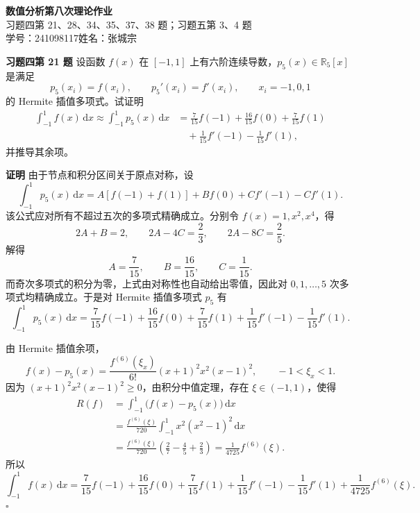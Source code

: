 \documentclass[UTF8,a4paper,11pt]{ctexart}
\newcommand{\dd}{\,\mathrm{d}}
\newcommand{\QED}{\hfill$\square$}
\begin{document}
\begin{center}
  {\LARGE\bfseries 数值分析\quad 第八次理论作业}\\[6pt]
  {\large 习题四第 21、28、34、35、37、38 题；习题五第 3、4 题}\\[4pt]
  {\normalsize 学号：241098117\quad 姓名：张城宗}
\end{center}

\bigskip

\noindent\textbf{习题四\quad 第 21 题}\quad
设函数 $f(x)$ 在 $[-1,1]$ 上有六阶连续导数，$p_5(x)\in \mathbb R_5[x]$ 是满足
\[
  p_5(x_i)=f(x_i),\qquad p_5'(x_i)=f'(x_i),
  \qquad x_i=-1,0,1
\]
的 Hermite 插值多项式。试证明
\[
\begin{aligned}
  \int_{-1}^{1}f(x)\dd x
  \approx \int_{-1}^{1}p_5(x)\dd x
  &=
  \frac{7}{15}f(-1)+\frac{16}{15}f(0)+\frac{7}{15}f(1)  \\
  &\quad+\frac{1}{15}f'(-1)-\frac{1}{15}f'(1),
\end{aligned}
\]
并推导其余项。

\medskip
\noindent\textbf{证明}\quad
由于节点和积分区间关于原点对称，设
\[
  \int_{-1}^{1}p_5(x)\dd x
  =A[f(-1)+f(1)]+Bf(0)+C f'(-1)-C f'(1).
\]
该公式应对所有不超过五次的多项式精确成立。分别令
$f(x)=1,x^2,x^4$，得
\[
  2A+B=2,\qquad
  2A-4C=\frac23,\qquad
  2A-8C=\frac25.
\]
解得
\[
  A=\frac{7}{15},\qquad B=\frac{16}{15},\qquad C=\frac{1}{15}.
\]
而奇次多项式的积分为零，上式由对称性也自动给出零值，因此对
$0,1,\ldots,5$ 次多项式均精确成立。于是对 Hermite 插值多项式
$p_5$ 有
\[
  \int_{-1}^{1}p_5(x)\dd x
  =
  \frac{7}{15}f(-1)+\frac{16}{15}f(0)+\frac{7}{15}f(1)
  +\frac{1}{15}f'(-1)-\frac{1}{15}f'(1).
\]

由 Hermite 插值余项，
\[
  f(x)-p_5(x)
  =
  \frac{f^{(6)}(\xi_x)}{6!}
  (x+1)^2x^2(x-1)^2,\qquad -1<\xi_x<1.
\]
因为 $(x+1)^2x^2(x-1)^2\ge 0$，由积分中值定理，存在
$\xi\in(-1,1)$，使得
\[
\begin{aligned}
  R(f)
  &=\int_{-1}^{1}\bigl(f(x)-p_5(x)\bigr)\dd x  \\
  &=\frac{f^{(6)}(\xi)}{720}
    \int_{-1}^{1}x^2(x^2-1)^2\dd x  \\
  &=\frac{f^{(6)}(\xi)}{720}
    \left(\frac{2}{7}-\frac{4}{5}+\frac{2}{3}\right)
   =\frac{1}{4725}f^{(6)}(\xi).
\end{aligned}
\]
所以
\[
  \boxed{
  \int_{-1}^{1}f(x)\dd x
  =
  \frac{7}{15}f(-1)+\frac{16}{15}f(0)+\frac{7}{15}f(1)
  +\frac{1}{15}f'(-1)-\frac{1}{15}f'(1)
  +\frac{1}{4725}f^{(6)}(\xi).}
\]
\QED
\end{document}
